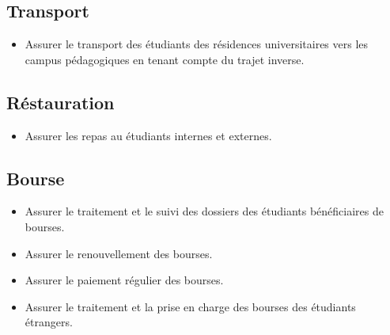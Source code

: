     \subsection*{Transport}
    \begin{itemize}
        \item Assurer le transport des étudiants des résidences universitaires vers les campus pédagogiques en tenant compte du trajet inverse.
    \end{itemize}

    \subsection*{Réstauration}
    \begin{itemize}
        \item Assurer les repas au étudiants internes et externes.
    \end{itemize}

    \subsection*{Bourse}
    \begin{itemize}
        \item Assurer le traitement et le suivi des dossiers des étudiants bénéficiaires de bourses.
        \item Assurer le renouvellement des bourses.
        \item Assurer le paiement régulier des bourses.
        \item Assurer le traitement et la prise en charge des bourses des étudiants étrangers.\\
    \end{itemize}

